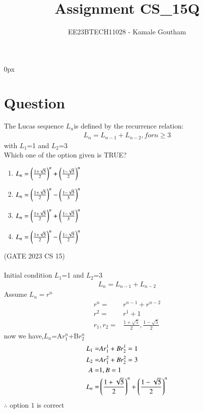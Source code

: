 \documentclass[journal,12pt,twocolumn]{IEEEtran}
\theoremstyle{remark}
\begin{document}
\parindent 0px

\title{Assignment CS\_15Q}
\author{EE23BTECH11028 - Kamale Goutham$^{}$%
}
\maketitle
\newpage
\bigskip
\section*{Question}
The Lucas sequence $L_{n}$is defined by the recurrence relation:\\
\begin{align*}
    L_{n}=L_{n-1}+L_{n-2}, for n\geq3
\end{align*}
with $L_{1}$=1 and $L_{2}$=3\\
Which one of the option given is TRUE?\\
\begin{enumerate}
    \item $L_{n}=\left(\frac{1+\sqrt{5}}{2}\right)^n+\left(\frac{1-\sqrt{5}}{2}\right)^n$
    \item $L_{n}=\left(\frac{1+\sqrt{5}}{2}\right)^n-\left(\frac{1-\sqrt{5}}{3}\right)^n$
    \item $L_{n}=\left(\frac{1+\sqrt{5}}{2}\right)^n+\left(\frac{1-\sqrt{5}}{3}\right)^n$
    \item $L_{n}=\left(\frac{1+\sqrt{5}}{2}\right)^n-\left(\frac{1-\sqrt{5}}{2}\right)^n$
\end{enumerate}
\hfill{(GATE 2023 CS 15)}\\
\solution\\
Initial condition $L_{1}$=1 and $L_{2}$=3
\begin{align}
 L_{n}=L_{n-1}+L_{n-2}
\end{align}
Assume $L_{n}=r^n$\\
\begin{align}
 r^n=&r^{n-1}+r^{n-2}\\
 r^2=&r^1+1\\
 r_1,r_2=&\frac{1+\sqrt{5}}{2},\frac{1-\sqrt{5}}{2}
 \end{align}
 now we have,\hspace{0.3cm}$L_{n}$=A$r_1^n$+B$r_2^n$\\
 \begin{align}
     L_1=&Ar_1^1+Br_2^1=1\\
     L_2=&Ar_1^2+Br_2^2=3\\
     A=&1,B=1\\
     L_n=&\left(\frac{1+\sqrt{5}}{2}\right)^n+\left(\frac{1-\sqrt{5}}{2}\right)^n
\end{align}
     $\therefore$ option $1$ is correct
\end{document}
